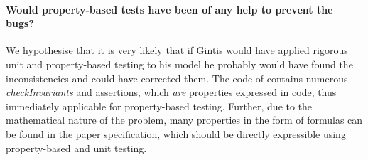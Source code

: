\paragraph{Would property-based tests have been of any help to prevent the bugs?}
We hypothesise that it is very likely that if Gintis would have applied rigorous unit and property-based testing to his model he probably would have found the inconsistencies and could have corrected them. The code of \cite{evensen_extensible_2010} contains numerous \textit{checkInvariants} and assertions, which \textit{are} properties expressed in code, thus immediately applicable for property-based testing. Further, due to the mathematical nature of the problem, many properties in the form of formulas can be found in the paper specification, which should be directly expressible using property-based and unit testing.